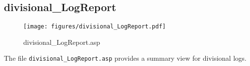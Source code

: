 \subsection{divisional\_LogReport}
\begin{figure}[htb]
    \begin{center}
        \texttt{[image: figures/divisional\_LogReport.pdf]}
    \end{center}
    \caption{divisional\_LogReport.asp}
    \label{fig:divisional_LogReport}
\end{figure}

The file \verb|divisional_LogReport.asp| provides a summary view for divisional
logs.
